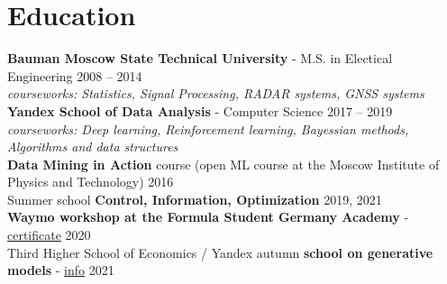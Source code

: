 \section*{\sectionformat Education}
\textbf{Bauman Moscow State Technical University} - M.S. in Electical Engineering \hfill 2008 -- 2014 \\
\textit{courseworks: Statistics, Signal Processing, RADAR systems, GNSS systems} \\
% 
\textbf{Yandex School of Data Analysis} - Computer Science \hfill 2017 -- 2019 \\
\textit{courseworks: Deep learning, Reinforcement learning, Bayessian methods, Algorithms and data structures} \\
% 
\textbf{Data Mining in Action} course (open ML course at the Moscow Institute of Physics and Technology) \hfill    2016         \\
% 
Summer school \textbf{Control, Information, Optimization}                                                                                             \hfill  2019, 2021 \\
%
\textbf{Waymo workshop at the Formula Student Germany Academy} - \href{https://drive.google.com/file/d/1-WxECccxBrRWIvEt9WQeXKTueiF658r7/view?usp=sharing}{certificate}   \hfill  2020       \\
% 
Third Higher School of Economics / Yandex autumn \textbf{school on generative models} - \href{https://indico.cern.ch/event/1082512/timetable/#20211123}{info}                  \hfill  2021
\nolinebreak